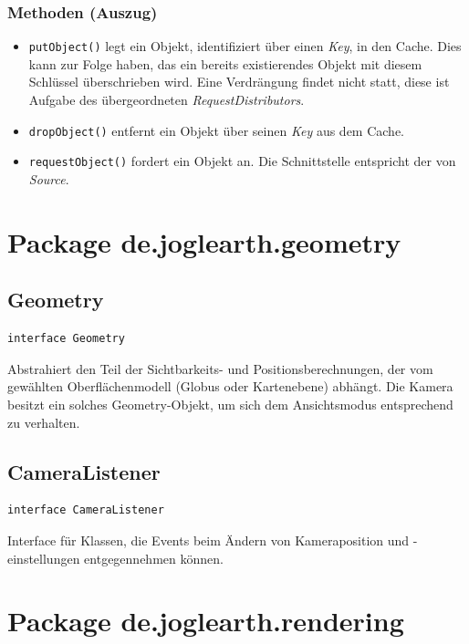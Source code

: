 \documentclass[10pt]{scrreprt}
\begin{document}
\subsubsection*{Methoden (Auszug)}
\begin{itemize}
\item \texttt{putObject()} legt ein Objekt, identifiziert über einen \textit{Key}, in den Cache. Dies kann zur Folge haben, das ein bereits existierendes Objekt mit diesem Schlüssel überschrieben wird. Eine Verdrängung findet nicht statt, diese ist Aufgabe des übergeordneten \textit{RequestDistributors}.
\item \texttt{dropObject()} entfernt ein Objekt über seinen \textit{Key} aus dem Cache.
\item \texttt{requestObject()} fordert ein Objekt an. Die Schnittstelle entspricht der von \textit{Source}.
\end{itemize}
\vspace{5mm}


\section{Package de.joglearth.geometry}
\subsection*{Geometry}
\begin{lstlisting}
interface Geometry
\end{lstlisting}
Abstrahiert den Teil der Sichtbarkeits- und Positionsberechnungen, der vom gewählten Oberflächenmodell (Globus oder Kartenebene) abhängt. Die Kamera besitzt ein solches Geometry-Objekt, um sich dem Ansichtsmodus entsprechend zu verhalten.\\

\vspace{5mm}
\subsection*{CameraListener}
\begin{lstlisting}
interface CameraListener
\end{lstlisting}
Interface für Klassen, die Events beim Ändern von Kameraposition und -einstellungen entgegennehmen können.\\

\pagebreak
\vspace{5mm}
\section{Package de.joglearth.rendering}
\end{document}
